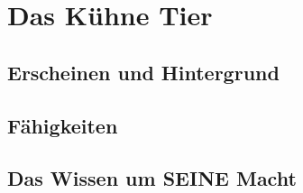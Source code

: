 \section{Das Kühne Tier}

\subsection{Erscheinen und Hintergrund}

\subsection{Fähigkeiten}


\subsection{Das Wissen um SEINE Macht}